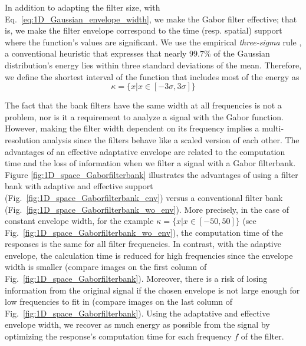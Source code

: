 In addition to adapting the filter size, with Eq.\ \eqref{eq:1D_Gaussian_envelope_width}, we make the Gabor filter effective; that is, we make the filter envelope correspond to the time (resp. spatial) support where the function's values are significant. We use the empirical \textit{three-sigma} rule \citep{Pukelsheim:AMSTAT:1994}, a conventional heuristic that expresses that nearly $99.7\%$ of the Gaussian distribution's energy lies within three standard deviations of the mean. Therefore, we define the shortest interval of the function that includes most of the energy as 
\begin{equation}
	\kappa = \lbrace x | x \in [-3\sigma, 3\sigma] \rbrace \label{eq:1D_gabor_support}
\end{equation}

The fact that the bank filters have the same width at all frequencies is not a problem, nor is it a requirement to analyze a signal with the Gabor function. However, making the filter width dependent on its frequency implies a multi-resolution analysis since the filters behave like a scaled version of each other. The advantages of an effective adaptative envelope are related to the computation time and the loss of information when we filter a signal with a Gabor filterbank. Figure \ref{fig:1D_space_Gaborfilterbank} illustrates the advantages of using a filter bank with adaptive and effective support (Fig.\ \ref{fig:1D_space_Gaborfilterbank_env}) versus a conventional filter bank (Fig.\ \ref{fig:1D_space_Gaborfilterbank_wo_env}). More precisely, in the case of constant envelope width, for the example $\kappa = \lbrace x | x \in [-50, 50] \rbrace$ (see Fig.\ \ref{fig:1D_space_Gaborfilterbank_wo_env}), the computation time of the responses is the same for all filter frequencies. In contrast, with the adaptive envelope, the calculation time is reduced for high frequencies since the envelope width is smaller (compare images on the first column of Fig.\ \ref{fig:1D_space_Gaborfilterbank}). Moreover, there is a risk of losing information from the original signal if the chosen envelope is not large enough for low frequencies to fit in (compare images on the last column of Fig.\ \ref{fig:1D_space_Gaborfilterbank}). Using the adaptative and effective envelope width, we recover as much energy as possible from the signal by optimizing the response's computation time for each frequency $f$ of the filter.

